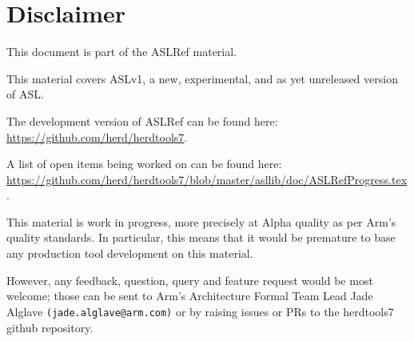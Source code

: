 \chapter{Disclaimer}

This document is part of the ASLRef material.

This material covers ASLv1, a new, experimental, and as yet unreleased version of ASL.

The development version of ASLRef can be found here: \\
\url{https://github.com/herd/herdtools7}.

A list of open items being worked on can be found here: \\
\url{https://github.com/herd/herdtools7/blob/master/asllib/doc/ASLRefProgress.tex}.

This material is work in progress, more precisely at Alpha quality as
per Arm’s quality standards. In particular, this means that it would be
premature to base any production tool development on this material.

However, any feedback, question, query and feature request would be most
welcome; those can be sent to Arm’s Architecture Formal Team Lead Jade Alglave
\texttt{(jade.alglave@arm.com)} or by raising issues or PRs to the herdtools7
github repository.
